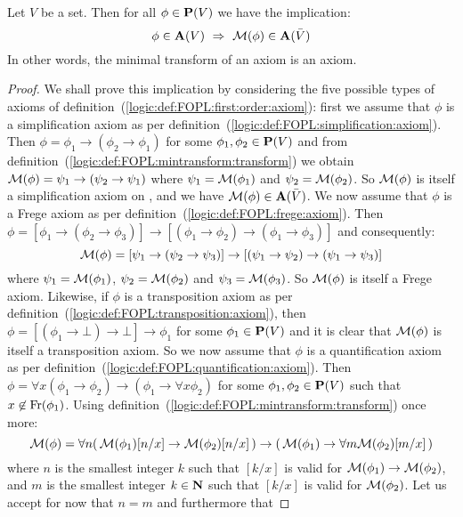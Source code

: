 \begin{lemma}\label{logic:lemma:FUAP:valsubaxmodulo:phi:m:phi}
Let $V$ be a set. Then for all $\phi\in\mbox{${\bf P}(V)$}$ we have the implication:
    \[
    \phi\in\av\ \Rightarrow\ {\cal M}(\phi)\in{\bf A}(\bar{V})
    \]
In other words, the minimal transform of an axiom is an axiom.
\end{lemma}
\begin{proof}
We shall prove this implication by considering the five possible
types of axioms of
definition~(\ref{logic:def:FOPL:first:order:axiom}): first we assume
that $\phi$ is a simplification axiom as per
definition~(\ref{logic:def:FOPL:simplification:axiom}). Then
$\phi=\phi_{1}\to(\phi_{2}\to\phi_{1})$ for some
$\phi_{1},\phi_{2}\in\mbox{${\bf P}(V)$}$ and from
definition~(\ref{logic:def:FOPL:mintransform:transform}) we obtain
${\cal M}(\phi)=\psi_{1}\to(\psi_{2}\to\psi_{1})$ where
$\psi_{1}={\cal M}(\phi_{1})$ and $\psi_{2}={\cal M}(\phi_{2})$. So
${\cal M}(\phi)$ is itself a simplification axiom on \pvb, and we
have ${\cal M}(\phi)\in{\bf A}(\bar{V})$. We now assume that $\phi$
is a Frege axiom as per
definition~(\ref{logic:def:FOPL:frege:axiom}). Then
$\phi=[\phi_{1}\to(\phi_{2}\to\phi_{3})]\to[(\phi_{1}\to\phi_{2})\to(\phi_{1}\to\phi_{3})]$
and consequently:
    \[
    {\cal M}(\phi)=[\psi_{1}\to(\psi_{2}\to\psi_{3})]\to[(\psi_{1}\to\psi_{2})\to(\psi_{1}\to\psi_{3})]
    \]
where $\psi_{1}={\cal M}(\phi_{1})$, $\psi_{2}={\cal M}(\phi_{2})$
and $\psi_{3}={\cal M}(\phi_{3})$. So ${\cal M}(\phi)$ is itself a
Frege axiom. Likewise, if $\phi$ is a transposition axiom as per
definition~(\ref{logic:def:FOPL:transposition:axiom}), then
$\phi=[(\phi_{1}\to\bot)\to\bot]\to\phi_{1}$ for some
$\phi_{1}\in\mbox{${\bf P}(V)$}$ and it is clear that ${\cal M}(\phi)$ is itself a
transposition axiom. So we now assume that $\phi$ is a
quantification axiom as per
definition~(\ref{logic:def:FOPL:quantification:axiom}). Then
$\phi=\forall x(\phi_{1}\to\phi_{2})\to(\phi_{1}
    \to\forall x \phi_{2})$ for some $\phi_{1},\phi_{2}\in\mbox{${\bf P}(V)$}$ such
that $x\not\in\mbox{\rm Fr}(\phi_{1})$. Using
definition~(\ref{logic:def:FOPL:mintransform:transform}) once more:
    \[
    {\cal M}(\phi)=\forall n(\,{\cal M}(\phi_{1})[n/x]\to{\cal
    M}(\phi_{2})[n/x]\,)\to(\,{\cal M}(\phi_{1})\to\forall m{\cal
    M}(\phi_{2})[m/x]\,)
    \]
where $n$ is the smallest integer $k$ such that $[k/x]$ is valid for
${\cal M}(\phi_{1})\to{\cal M}(\phi_{2})$, and $m$ is the smallest
integer $k\in\mbox{$\bf N$}$ such that $[k/x]$ is valid for ${\cal
M}(\phi_{2})$. Let us accept for now that $n=m$ and furthermore that

\end{proof}

